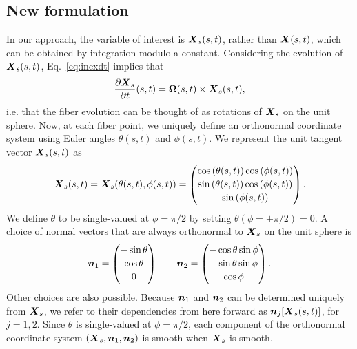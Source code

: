 \subsection{New formulation \label{sec:geo}}
In our approach, the variable of interest is $\boldsymbol{X}_s(s,t)$, rather than $\boldsymbol{X}(s,t)$, which can be obtained by integration modulo a constant. Considering the evolution of $\boldsymbol{X}_s(s,t)$, Eq.\ \eqref{eq:inexdt} implies that 
\begin{equation}
\label{eq:omegadef}
\frac{\partial \boldsymbol{X}_s}{\partial t}(s,t) = \boldsymbol{\Omega}(s, t) \times \boldsymbol{X}_s(s,t), 
\end{equation}
i.e. that the fiber evolution can be thought of as rotations of $\boldsymbol{X}_s$ on the unit sphere. Now, at each fiber point, we uniquely define an orthonormal coordinate system using Euler angles $\theta(s,t)$ and $\phi(s,t)$. We represent the unit tangent vector $\boldsymbol{X}_s(s,t)$ as
\begin{equation}
\boldsymbol{X}_s(s,t)=\boldsymbol{X}_s(\theta(s,t),\phi(s,t)) = \begin{pmatrix} \cos{\left(\theta(s,t)\right)} \cos{\left(\phi(s,t)\right)}\\[2 pt] \sin{\left(\theta(s,t)\right)} \cos{\left(\phi(s,t)\right)} \\[2 pt] \sin{\left(\phi(s,t)\right)} \end{pmatrix}.
\end{equation}
We define $\theta$ to be single-valued at $\phi=\pi/2$ by setting $\theta \left(\phi=\pm \pi/2\right)=0$. A choice of normal vectors that are always orthonormal to $\boldsymbol{X}_s$ on the unit sphere is
\begin{equation}
\label{eq:nangles}
\boldsymbol{n}_1 =  \begin{pmatrix} -\sin{\theta}\\[2 pt] \cos{\theta}\\[2 pt]0 \end{pmatrix} \qquad \boldsymbol{n}_2 =  \begin{pmatrix} -\cos{\theta} \sin{\phi}\\[2 pt] -\sin{\theta} \sin{\phi} \\[2 pt] \cos{\phi} \end{pmatrix}. 
\end{equation}
Other choices are also possible. Because $\boldsymbol{n}_1$ and $\boldsymbol{n}_2$ can be determined uniquely from $\boldsymbol{X}_s$, we refer to their dependencies from here forward as $\boldsymbol{n}_j[\boldsymbol{X}_s(s,t)]$, for $j=1, 2$. Since $\theta$ is single-valued at $\phi=\pi/2$, each component of the orthonormal coordinate system $(\boldsymbol{X}_s,\boldsymbol{n}_1,\boldsymbol{n}_2)$ is smooth when $\boldsymbol{X}_s$ is smooth. 

